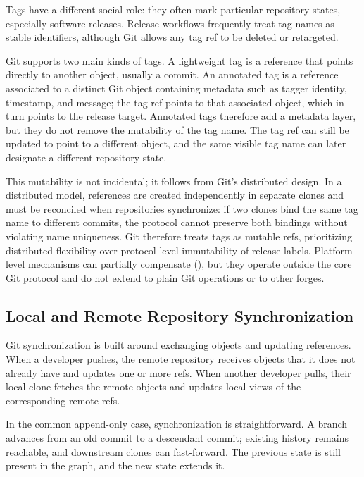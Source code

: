 Tags have a different social role: they often mark particular repository states, especially software releases.
Release workflows frequently treat tag names as stable identifiers, although Git allows any tag ref to be deleted or retargeted.

Git supports two main kinds of tags.
A lightweight tag is a reference that points directly to another object, usually a commit.
An annotated tag is a reference associated to a distinct Git object containing metadata such as tagger identity, timestamp, and message; the tag ref points to that associated object, which in turn points to the release target.
Annotated tags therefore add a metadata layer, but they do not remove the mutability of the tag name.
The tag ref can still be updated to point to a different object, and the same visible tag name can later designate a different repository state.

This mutability is not incidental; it follows from Git's distributed design.
In a distributed model, references are created independently in separate clones and must be reconciled when repositories synchronize: if two clones bind the same tag name to different commits, the protocol cannot preserve both bindings without violating name uniqueness.
Git therefore treats tags as mutable refs, prioritizing distributed flexibility over protocol-level immutability of release labels.
Platform-level mechanisms can partially compensate (), but they operate outside the core Git protocol and do not extend to plain Git operations or to other forges.

\subsection{Local and Remote Repository Synchronization}
\label{subsec:bg-local-remote-synchronization}

Git synchronization is built around exchanging objects and updating references.
When a developer pushes, the remote repository receives objects that it does not already have and updates one or more refs.
When another developer pulls, their local clone fetches the remote objects and updates local views of the corresponding remote refs.

In the common append-only case, synchronization is straightforward.
A branch advances from an old commit to a descendant commit; existing history remains reachable, and downstream clones can fast-forward.
The previous state is still present in the graph, and the new state extends it.


